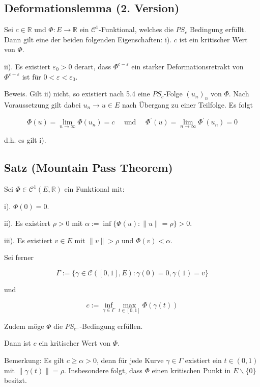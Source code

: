 \documentclass[10pt, letterpaper]{article}
\begin{document}
\subsection*{Deformationslemma (2. Version)}

Sei $c \in \mathbb{R}$ und $\Phi: E \rightarrow \mathbb{R}$ ein $\mathcal{C}^{1}$-Funktional, welches die $P S_{c}$ Bedingung erfüllt. Dann gilt eine der beiden folgenden Eigenschaften:
i). $c$ ist ein kritischer Wert von $\Phi$.

ii). Es existiert $\varepsilon_{0}>0$ derart, dass $\Phi^{c-\varepsilon}$ ein starker Deformationsretrakt von $\Phi^{c+\varepsilon}$ ist für $0<\varepsilon<\varepsilon_{0}$.

Beweis. Gilt ii) nicht, so existiert nach 5.4 eine $P S_{c}$-Folge $\left(u_{n}\right)_{n}$ von $\Phi$. Nach Voraussetzung gilt dabei $u_{n} \rightarrow u \in E$ nach Übergang zu einer Teilfolge. Es folgt

$$
\Phi(u)=\lim _{n \rightarrow \infty} \Phi\left(u_{n}\right)=c \quad \text { und } \quad \Phi^{\prime}(u)=\lim _{n \rightarrow \infty} \Phi^{\prime}\left(u_{n}\right)=0
$$

d.h. es gilt i).

\subsection*{Satz (Mountain Pass Theorem)}

Sei $\Phi \in \mathcal{C}^{1}(E, \mathbb{R})$ ein Funktional mit:

i). $\Phi(0)=0$.

ii). Es existiert $\rho>0$ mit $\alpha:=\inf \{\Phi(u):\|u\|=\rho\}>0$.

iii). Es existiert $v \in E$ mit $\|v\|>\rho$ und $\Phi(v)<\alpha$.

Sei ferner

$$
\Gamma:=\{\gamma \in \mathcal{C}([0,1], E): \gamma(0)=0, \gamma(1)=v\}
$$

und

$$
c:=\inf _{\gamma \in \Gamma} \max _{t \in[0,1]} \Phi(\gamma(t))
$$

Zudem möge $\Phi$ die $P S_{c^{-}}$-Bedingung erfüllen.

Dann ist $c$ ein kritischer Wert von $\Phi$.

Bemerkung: Es gilt $c \geq \alpha>0$, denn für jede Kurve $\gamma \in \Gamma$ existiert ein $t \in(0,1)$ mit $\|\gamma(t)\|=\rho$. Insbesondere folgt, dass $\Phi$ einen kritischen Punkt in $E \backslash\{0\}$ besitzt.
\end{document}
